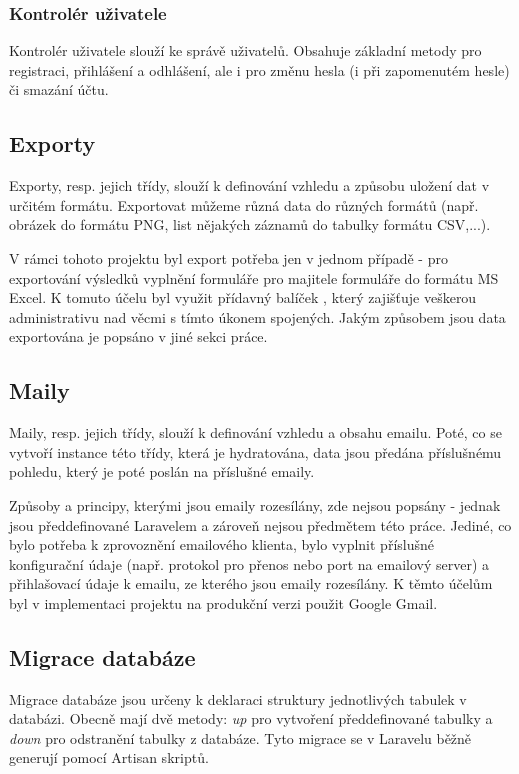 		\subsubsection{Kontrolér uživatele}
		Kontrolér uživatele slouží ke správě uživatelů. Obsahuje základní metody pro registraci, přihlášení a odhlášení, ale i pro změnu hesla (i při zapomenutém hesle) či smazání účtu.
	
	\subsection{Exporty}
	Exporty, resp. jejich třídy, slouží k definování vzhledu a způsobu uložení dat v určitém formátu. Exportovat můžeme různá data do různých formátů (např. obrázek do formátu PNG, list nějakých záznamů do tabulky formátu CSV,...).
	
	V rámci tohoto projektu byl export potřeba jen v jednom případě - pro exportování výsledků vyplnění formuláře pro majitele formuláře do formátu MS Excel. K tomuto účelu byl využit přídavný balíček , který zajišťuje veškerou administrativu nad věcmi s tímto úkonem spojených. Jakým způsobem jsou data exportována je popsáno v jiné sekci práce.
	
	\subsection{Maily}
	Maily, resp. jejich třídy, slouží k definování vzhledu a obsahu emailu. Poté, co se vytvoří instance této třídy, která je hydratována, data jsou předána příslušnému pohledu, který je poté poslán na příslušné emaily.
	
	Způsoby a principy, kterými jsou emaily rozesílány, zde nejsou popsány - jednak jsou předdefinované Laravelem a zároveň nejsou předmětem této práce. Jediné, co bylo potřeba k zprovoznění emailového klienta, bylo vyplnit příslušné konfigurační údaje (např. protokol pro přenos nebo port na emailový server) a přihlašovací údaje k emailu, ze kterého jsou emaily rozesílány. K těmto účelům byl v implementaci projektu na produkční verzi použit Google Gmail.
	
	\subsection{Migrace databáze}
	Migrace databáze jsou určeny k deklaraci struktury jednotlivých tabulek v databázi. Obecně mají dvě metody: \textit{up} pro vytvoření předdefinované tabulky a \textit{down} pro odstranění tabulky z databáze. Tyto migrace se v Laravelu běžně generují pomocí Artisan skriptů.
	
